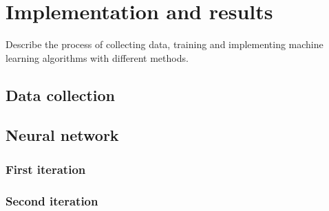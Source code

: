 \chapter{Implementation and results}
Describe the process of collecting data, training and implementing machine learning algorithms with different methods.

\section{Data collection}

\section{Neural network}
	\subsection{First iteration}
	\subsection{Second iteration}

